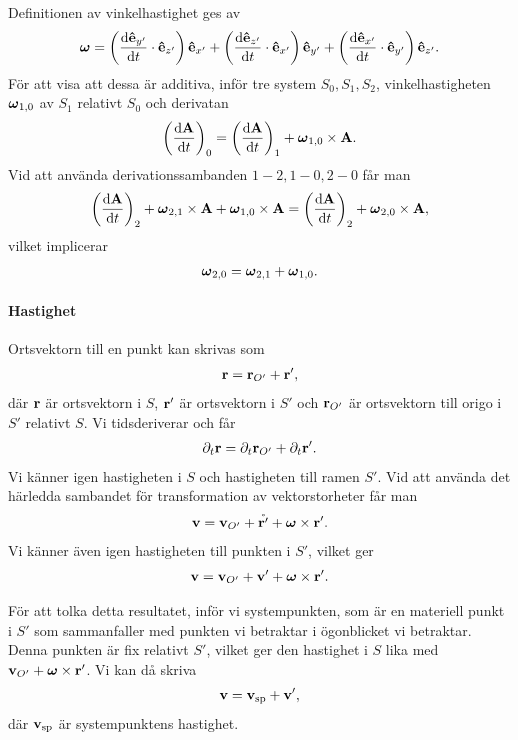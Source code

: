 Definitionen av vinkelhastighet ges av
\begin{align*}
	\vb*{\omega} = \left(\dv{\vu{e}_{y'}}{t}\cdot\vu{e}_{z'}\right)\vu{e}_{x'} + \left(\dv{\vu{e}_{z'}}{t}\cdot\vu{e}_{x'}\right)\vu{e}_{y'} + \left(\dv{\vu{e}_{x'}}{t}\cdot\vu{e}_{y'}\right)\vu{e}_{z'}.
\end{align*}
För att visa att dessa är additiva, inför tre system $S_0, S_1, S_2$, vinkelhastigheten $\vb*{\omega}_{1, 0}$ av $S_1$ relativt $S_0$ och derivatan
\begin{align*}
	\left(\dv{\vb{A}}{t}\right)_{0} = \left(\dv{\vb{A}}{t}\right)_{1} + \vb*{\omega}_{1, 0}\times\vb{A}.
\end{align*}
Vid att använda derivationssambanden $1 - 2, 1 - 0, 2 - 0$ får man
\begin{align*}
	\left(\dv{\vb{A}}{t}\right)_{2} + \vb*{\omega}_{2, 1}\times\vb{A} + \vb*{\omega}_{1, 0}\times\vb{A} = \left(\dv{\vb{A}}{t}\right)_{2} + \vb*{\omega}_{2, 0}\times\vb{A},
\end{align*}
vilket implicerar
\begin{align*}
	\vb*{\omega}_{2, 0} = \vb*{\omega}_{2, 1} + \vb*{\omega}_{1, 0}.
\end{align*}

\paragraph{Hastighet}
Ortsvektorn till en punkt kan skrivas som
\begin{align*}
	\vb{r} = \vb{r}_{O'} + \vb{r}',
\end{align*}
där $\vb{r}$ är ortsvektorn i $S$, $\vb{r}'$ är ortsvektorn i $S'$ och $\vb{r}_{O'}$ är ortsvektorn till origo i $S'$ relativt $S$. Vi tidsderiverar och får
\begin{align*}
	\partial_{t}\vb{r} = \partial_{t}\vb{r}_{O'} + \partial_{t}\vb{r}'.
\end{align*}
Vi känner igen hastigheten i $S$ och hastigheten till ramen $S'$. Vid att använda det härledda sambandet för transformation av vektorstorheter får man
\begin{align*}
	\vb{v} = \vb{v}_{O'} + \mathring{\vb{r}'} + \vb*{\omega}\times\vb{r}'.
\end{align*}
Vi känner även igen hastigheten till punkten i $S'$, vilket ger
\begin{align*}
	\vb{v} = \vb{v}_{O'} + \vb{v}' + \vb*{\omega}\times\vb{r}'.
\end{align*}

För att tolka detta resultatet, inför vi systempunkten, som är en materiell punkt i $S'$ som sammanfaller med punkten vi betraktar i ögonblicket vi betraktar. Denna punkten är fix relativt $S'$, vilket ger den hastighet i $S$ lika med $\vb{v}_{O'} + \vb*{\omega}\times\vb{r}'$. Vi kan då skriva
\begin{align*}
	\vb{v} = \vb{v}_{\text{sp}} + \vb{v}',
\end{align*}
där $\vb{v}_{\text{sp}}$ är systempunktens hastighet.


